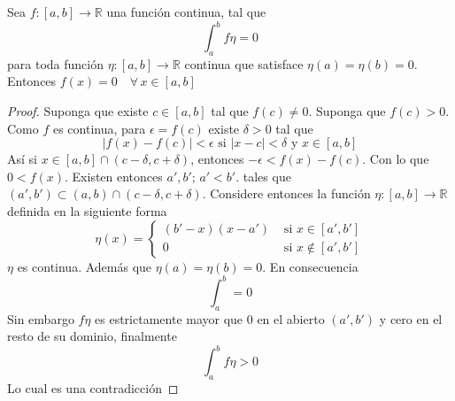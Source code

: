 \begin{lemma}
  Sea $f: [a, b] \to \mathbb{R}$ una función continua, tal que
  \[
    \int_a^b f \eta = 0
  \]
 para toda función $\eta: [a,b] \to \mathbb{R}$ continua que satisface
 $\eta(a) = \eta(b) = 0$. Entonces $f(x) = 0 \quad \forall \, x \in [a, b]$

\end{lemma}
\begin{proof}
  Suponga que existe $c \in [a,b]$ tal que $f(c) \neq 0$. Suponga que $f(c)>0$.
  Como $f$ es continua, para $\epsilon =f(c)$ existe $\delta > 0 $ tal que 
  \[
    | f(x) - f(c) | < \epsilon \mbox{ si } | x-c| < \delta%
    \mbox{ y } x \in [a, b]
  \]
  Así si $x \in [a, b] \cap ( c- \delta, c + \delta)$, entonces $-\epsilon <
  f(x) - f(c)$. Con lo que $0 < f(x)$. Existen entonces $a', b'$; $a'<b'$. tales
  que $(a',b') \subset (a,b) \cap (c-\delta, c+ \delta)$. Considere entonces la
  función $\eta: [a,b] \to \mathbb{R}$ definida en la siguiente forma
  \[
    \eta(x) =%
    \begin{cases}
      (b'-x)(x-a') &\mbox{ si } x \in [a',b'] \\ 
      0 &\mbox{ si } x \notin [a',b']  
    \end{cases}
  \]
  $\eta$ es continua. Además que $\eta(a)= \eta (b) = 0$. En consecuencia
  \[
    \int_a^b = 0
  \]
  Sin embargo $f\eta$ es estrictamente mayor que 0 en el abierto $(a',b')$ y
  cero en el resto de su dominio, finalmente
  \[
    \int_a^b f\eta > 0
  \]
  Lo cual es una contradicción

\end{proof}

